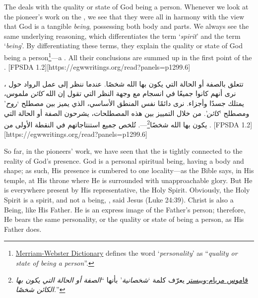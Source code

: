 



The  deals with the quality or state of God being a person. Whenever we look at the pioneer's work on the , we see that they were all in harmony with the view that God is a tangible \textit{being}, possessing both body and parts. We always see the same underlying reasoning, which differentiates the term ‘\textit{spirit}’ and the term ‘\textit{being}’. By differentiating these terms, they explain the quality or state of God being a person\footnote{\href{https://www.merriam-webster.com/dictionary/personality}{Merriam-Webster Dictionary} defines the word ‘\textit{personality}’ as “\textit{quality or state of being a person}”.}—a . All their conclusions are summed up in the first point of the . [FPSDA 1.2][https://egwwritings.org/read?panels=p1299.6]


تتعلق  بالصفة أو الحالة التي يكون بها الله شخصًا. عندما ننظر إلى عمل الرواد حول ، نرى أنهم كانوا جميعًا في انسجام مع وجهة النظر التي تقول إن الله \textit{كائن} ملموس، يمتلك جسدًا وأجزاء. نرى دائمًا نفس المنطق الأساسي، الذي يميز بين مصطلح ‘\textit{روح}’ ومصطلح ‘\textit{كائن}’. من خلال التمييز بين هذه المصطلحات، يشرحون الصفة أو الحالة التي يكون بها الله شخصًا\footnote{\href{https://www.merriam-webster.com/dictionary/personality}{قاموس مريام-ويبستر} يعرّف كلمة ‘\textit{شخصانية}’ بأنها “\textit{الصفة أو الحالة التي يكون بها الكائن شخصًا.}”}—. تُلخص جميع استنتاجاتهم في النقطة الأولى من . [FPSDA 1.2][https://egwwritings.org/read?panels=p1299.6]


So far, in the pioneers’ work, we have seen that the  is tightly connected to the reality of God’s presence. God is a personal spiritual being, having a body and shape; as such, His presence is cumbered to one locality—as the Bible says, in His temple, at His throne where He is surrounded with unapproachable glory. But He is everywhere present by His representative, the Holy Spirit. Obviously, the Holy Spirit is a spirit, and not a being, , said Jesus (Luke 24:39). Christ is also a Being, like His Father. He is an express image of the Father’s person; therefore, He bears the same personality, or the quality or state of being a person, as His Father does.


